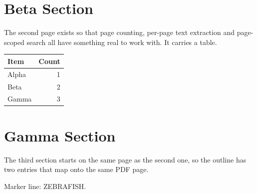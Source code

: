 \documentclass[11pt]{article}
\begin{document}
\newpage
\section{Beta Section}
\label{sec:beta}
The second page exists so that page counting, per-page text extraction and
page-scoped search all have something real to work with. It carries a table.

\begin{tabular}{|l|r|}
  \hline
  Item & Count \\
  \hline
  Alpha & 1 \\
  Beta  & 2 \\
  Gamma & 3 \\
  \hline
\end{tabular}

\section{Gamma Section}
The third section starts on the same page as the second one, so the outline has
two entries that map onto the same PDF page.

Marker line: ZEBRAFISH.
\end{document}
